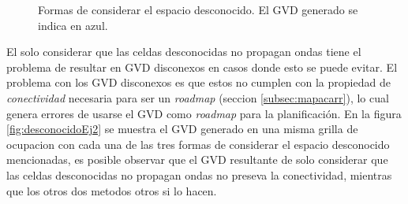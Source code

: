 \begin{figure}[H]
  \centerfloat

  \quad

  \caption[Formas de considerar el espacio desconocido.]{Formas de considerar el espacio desconocido. El GVD generado se indica en azul.}\label{fig:desconocidoEj1}
\end{figure}


El solo considerar que las celdas desconocidas no propagan ondas tiene el
problema de resultar en GVD disconexos en casos donde esto se puede evitar. El
problema con los GVD disconexos es que estos no cumplen con la propiedad de
\emph{conectividad} necesaria para ser un \emph{roadmap} (seccion
\ref{subsec:mapacarr}), lo cual genera errores de usarse el GVD como
\emph{roadmap} para la planificación. En la figura \ref{fig:desconocidoEj2} se
muestra el GVD generado en una misma grilla de ocupacion con cada una de las
tres formas de considerar el espacio desconocido mencionadas, es posible
observar que el GVD resultante de solo considerar que las celdas desconocidas
no propagan ondas no preseva la conectividad, mientras que los otros dos
metodos otros si lo hacen.

